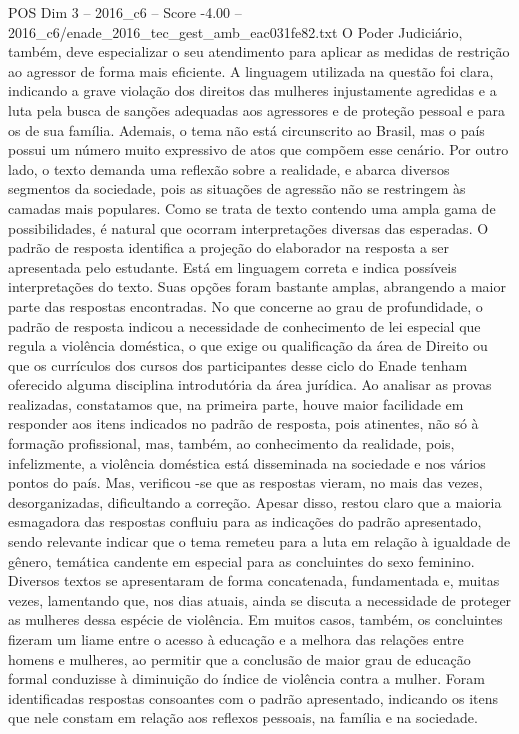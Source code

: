 \begin{textsample}{POS Dim 3 – 2016\_c6 – Score -4.00 – 2016\_c6/enade\_2016\_tec\_gest\_amb\_eac031fe82.txt}
O Poder Judiciário, também, deve especializar o seu atendimento para aplicar as medidas de restrição ao agressor de forma mais eficiente.
A linguagem utilizada na questão foi clara, indicando a grave violação dos direitos das mulheres injustamente agredidas e a luta pela busca de sanções adequadas aos agressores e de proteção pessoal e para os de sua família.
Ademais, o tema não está circunscrito ao Brasil, mas o país possui um número muito expressivo de atos que compõem esse cenário.
Por outro lado, o texto demanda uma reflexão sobre a realidade, e abarca diversos segmentos da sociedade, pois as situações de agressão não se restringem às camadas mais populares.
Como se trata de texto contendo uma ampla gama de possibilidades, é natural que ocorram interpretações diversas das esperadas.
O padrão de resposta identifica a projeção do elaborador na resposta a ser apresentada pelo estudante.
Está em linguagem correta e indica possíveis interpretações do texto.
Suas opções foram bastante amplas, abrangendo a maior parte das respostas encontradas.
No que concerne ao grau de profundidade, o padrão de resposta indicou a necessidade de conhecimento de lei especial que regula a violência doméstica, o que exige ou qualificação da área de Direito ou que os currículos dos cursos dos participantes desse ciclo do Enade tenham oferecido alguma disciplina introdutória da área jurídica.
Ao analisar as provas realizadas, constatamos que, na primeira parte, houve maior facilidade em responder aos itens indicados no padrão de resposta, pois atinentes, não só à formação profissional, mas, também, ao conhecimento da realidade, pois, infelizmente, a violência doméstica está disseminada na sociedade e nos vários pontos do país.
Mas, verificou -se que as respostas vieram, no mais das vezes, desorganizadas, dificultando a correção.
Apesar disso, restou claro que a maioria esmagadora das respostas confluiu para as indicações do padrão apresentado, sendo relevante indicar que o tema remeteu para a luta em relação à igualdade de gênero, temática candente em especial para as concluintes do sexo feminino.
Diversos textos se apresentaram de forma concatenada, fundamentada e, muitas vezes, lamentando que, nos dias atuais, ainda se discuta a necessidade de proteger as mulheres dessa espécie de violência.
Em muitos casos, também, os concluintes fizeram um liame entre o acesso à educação e a melhora das relações entre homens e mulheres, ao permitir que a conclusão de maior grau de educação formal conduzisse à diminuição do índice de violência contra a mulher.
Foram identificadas respostas consoantes com o padrão apresentado, indicando os itens que nele constam em relação aos reflexos pessoais, na família e na sociedade.

\end{textsample}
